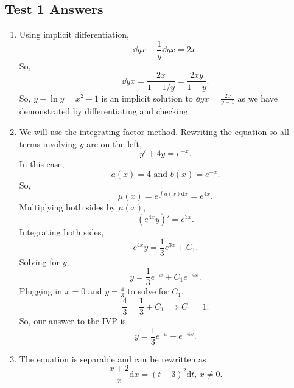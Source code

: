 \subsection{Test 1 Answers}
\begin{enumerate}[label=\arabic*.]
	\item 
		Using implicit differentiation,
		\begin{equation*}
			\dd{y}{x}-\frac{1}{y}\dd{y}{x} = 2x.
		\end{equation*}
		So,
		\begin{equation*}
			\dd{y}{x} = \frac{2x}{1-1/y} = \frac{2xy}{1-y}.
		\end{equation*}
		So, $y - \ln{y} = x^2 + 1$ is an implicit solution to $\dd{y}{x} = \frac{2x}{y-1}$ as we have demonstrated by differentiating and checking.
	\item
		We will use the integrating factor method. Rewriting the equation so all terms involving $y$ are on the left,
		\begin{equation*}
			y' + 4y = e^{-x}.
		\end{equation*}
		In this case,
		\begin{equation*}
			a(x) = 4 \text{ and } b(x) = e^{-x}.
		\end{equation*}
		So,
		\begin{equation*}
			\mu(x) = e^{\int{a(x) \mathrm{d}x}} = e^{4x}.
		\end{equation*}
		Multiplying both sides by $\mu(x)$,
		\begin{equation*}
			\left(e^{4x}y\right)' = e^{3x}.
		\end{equation*}
		Integrating both sides,
		\begin{equation*}
			e^{4x}y = \frac{1}{3}e^{3x} + C_1.
		\end{equation*}
		Solving for $y$,
		\begin{equation*}
			y = \frac{1}{3}e^{-x} + C_1e^{-4x}.
		\end{equation*}
		Plugging in $x = 0$ and $y=\frac{4}{3}$ to solve for $C_1$,
		\begin{equation*}
			\frac{4}{3} = \frac{1}{3} + C_1 \implies C_1 = 1.
		\end{equation*}
		So, our answer to the IVP is
		\begin{equation*}
			y = \frac{1}{3}e^{-x} + e^{-4x}.
		\end{equation*}
	\item
		The equation is separable and can be rewritten as
		\begin{equation*}
			\frac{x+2}{x} \mathrm{d}x = (t-3)^2 \mathrm{d}t \text{, } x\neq 0.

\end{equation*}
\end{enumerate}
